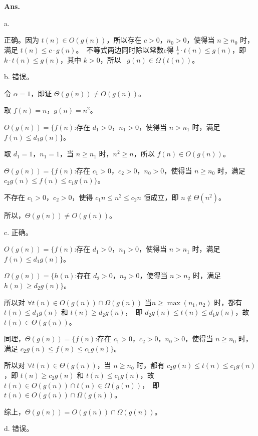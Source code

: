\documentclass[12pt, a4paper, UTF8, fontset=windows]{ctexbook}
\newenvironment{solution}{\par\noindent\textbf{Ans.}}{\par}
\begin{document}
\begin{solution}

    a. 
    
    正确。因为 $t(n) \in O(g(n))$，所以存在 $c > 0$，$n_0 > 0$，使得当 $ n \ge n_0$ 时，满足 $t(n) \leq c \cdot g(n)$。\ 
    不等式两边同时除以常数c得 $\frac{1}{c} \cdot t(n) \leq g(n)$，即 $k \cdot t(n) \leq g(n)$，其中 $k > 0$，所以 \
    $g(n) \in \Omega(t(n))$。
    \vspace{2mm}  %
    
    b. 错误。

    令 $\alpha = 1$，即证 $\Theta(g(n)) \neq O(g(n))$。

    取 $f(n) = n$，$g(n) = n^2$。
    
    $O(g(n)) = \{f(n)$:存在 $d_1 > 0$，$n_1 > 0$，使得当 $n > n_1$ 时，满足 $f(n) \le  d_1 g(n)\}$。

    取 $d_1 = 1$，$n_1 = 1$，当 $n \ge n_1$ 时，$n^2 \ge n$，所以 $f(n) \in O(g(n))$。

    $\Theta(g(n)) = \{f(n)$:存在 $c_1 >0$，$c_2 >0$，$n_0 > 0$，使得当 $n \ge n_0$ 时，满足 $c_2 g(n) \le f(n) \le c_1 g(n)\}$。 

    不存在 $c_1 > 0$，$c_2 > 0$，使得 $c_1 n \le n^2 \le c_2 n$ 恒成立，即 $n \notin \Theta(n^2)$。

    所以，$\Theta(g(n)) \neq O(g(n))$。
    \vspace{2mm}  %

    c. 正确。 

    $O(g(n)) = \{f(n)$:存在 $d_1 > 0$，$n_1 > 0$，使得当 $n > n_1$ 时，满足 $f(n) \le  d_1 g(n)\}$。 

    $\Omega(g(n)) = \{h(n)$:存在 $d_2 > 0$，$n_2 > 0$，使得当 $n > n_2$ 时，满足 $h(n) \ge d_2 g(n)\}$。
    
    所以对 $\forall t(n) \in O(g(n)) \cap \Omega(g(n))$ 当$n \ge \max(n_1, n_2)$ 时，都有 $t(n) \le d_1 g(n)$ 和 $t(n) \ge d_2 g(n)$，\
    即 $d_2 g(n) \le t(n) \le d_1 g(n)$，故 $t(n) \in \Theta(g(n))$。

    同理，$\Theta(g(n)) = \{f(n)$:存在 $c_1 >0$，$c_2 >0$，$n_0 > 0$，使得当 $n \ge n_0$ 时，满足 $c_2 g(n) \le f(n) \le c_1 g(n)\}$。 

    所以对 $\forall t(n) \in \Theta(g(n))$，当 $n \ge n_0$ 时，都有 $c_2 g(n) \le t(n) \le c_1 g(n)$，即 $t(n) \ge c_2 g(n)$ 和 $t(n) \le c_1 g(n)$，故 $t(n) \in O(g(n)) \cap t(n) \in \Omega(g(n))$，\
    即 $t(n) \in O(g(n)) \cap \Omega(g(n))$。
    
    综上，$\Theta(g(n)) = O(g(n)) \cap \Omega(g(n))$。
    \vspace{2mm}  %

    d. 错误。
\end{solution}
\end{document}
